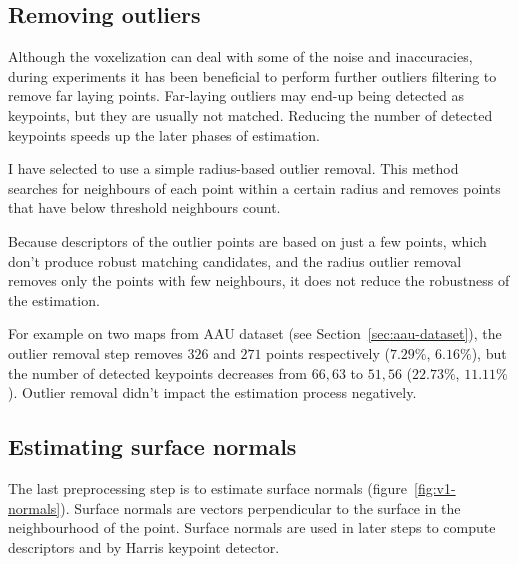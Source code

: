 \subsection{Removing outliers}
\label{sec:outlier-removal}

Although the voxelization can deal with some of the noise and inaccuracies, during experiments it has been beneficial to perform further outliers filtering to remove far laying points. Far-laying outliers may end-up being detected as keypoints, but they are usually not matched. Reducing the number of detected keypoints speeds up the later phases of estimation.

I have selected to use a simple radius-based outlier removal. This method searches for neighbours of each point within a certain radius and removes points that have below threshold neighbours count.

Because descriptors of the outlier points are based on just a few points, which don't produce robust matching candidates, and the radius outlier removal removes only the points with few neighbours, it does not reduce the robustness of the estimation.

For example on two maps from \gls{AAU} dataset (see Section~\ref{sec:aau-dataset}), the outlier removal step removes $326$ and $271$ points respectively ($7.29\%$, $6.16\%$), but the number of detected keypoints decreases from $66, 63$ to $51, 56$ ($22.73\%$, $11.11\%$). Outlier removal didn't impact the estimation process negatively.

\subsection{Estimating surface normals}
\label{sec:normal-estimation}

The last preprocessing step is to estimate surface normals (figure~\ref{fig:v1-normals}). Surface normals are vectors perpendicular to the surface in the neighbourhood of the point. Surface normals are used in later steps to compute descriptors and by Harris keypoint detector.

